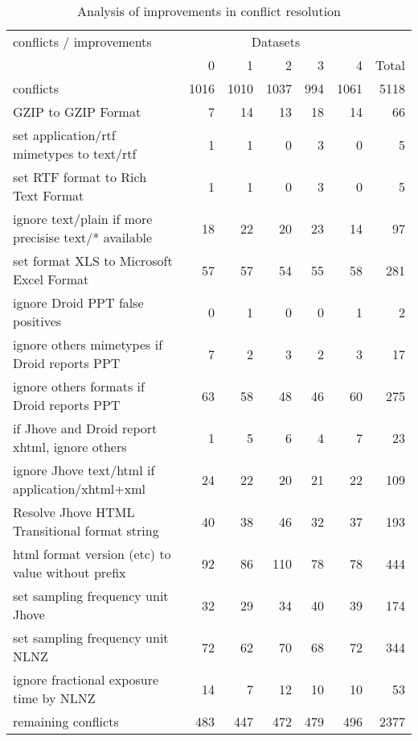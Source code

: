 \documentclass[a4paper,12pt]{article}
\begin{document}
\begin{table}[ht]
\begin{center}
\begin{tabular}[h]{l||r|r|r|r|r||r}
conflicts / improvements &  \multicolumn{5}{c}{Datasets} \\
        & 0 & 1 & 2 & 3 & 4 & Total \\
\hline
conflicts & 1016 & 1010	& 1037 & 994 &1061 & 5118 \\
\hline
GZIP to GZIP Format & 7 & 14 & 13 & 18 & 14 & 66\\
set application/rtf mimetypes to text/rtf & 1 & 1 & 0 & 3 & 0 & 5\\
set RTF format to Rich Text Format & 1 & 1 & 0 & 3 & 0 & 5\\
ignore text/plain if more precisise text/* available & 18 & 22 & 20 & 23 & 14 & 97\\
set format XLS to Microsoft Excel Format & 57 & 57 & 54 & 55 & 58 & 281\\
ignore Droid PPT false positives & 0 & 1 & 0 & 0 & 1 & 2\\
ignore others mimetypes if Droid reports PPT & 7 & 2 & 3 & 2 & 3 & 17\\
ignore others formats if Droid reports PPT & 63 & 58 & 48 & 46 & 60 & 275\\
if Jhove and Droid report xhtml, ignore others & 1 & 5 & 6 & 4 & 7 & 23\\
ignore Jhove text/html if application/xhtml+xml & 24 & 22 & 20 & 21 & 22 & 109\\
Resolve Jhove HTML Transitional format string & 40 & 38 & 46 & 32 & 37 & 193\\
html format version (etc) to value without prefix & 92 & 86 & 110 & 78 & 78 & 444\\
set sampling frequency unit Jhove & 32 & 29 & 34 & 40 & 39 & 174\\
set sampling frequency unit NLNZ & 72 & 62 & 70 & 68 & 72 & 344\\
ignore fractional exposure time by NLNZ & 14 & 7 & 12 & 10 & 10 & 53\\
\hline
remaining conflicts & 483 &	447	& 472 &	479	& 496 &	2377

\end{tabular}
\end{center}
\caption{Analysis of improvements in conflict resolution}
\label{tab:conflicts}
\end{table}
\end{document}
